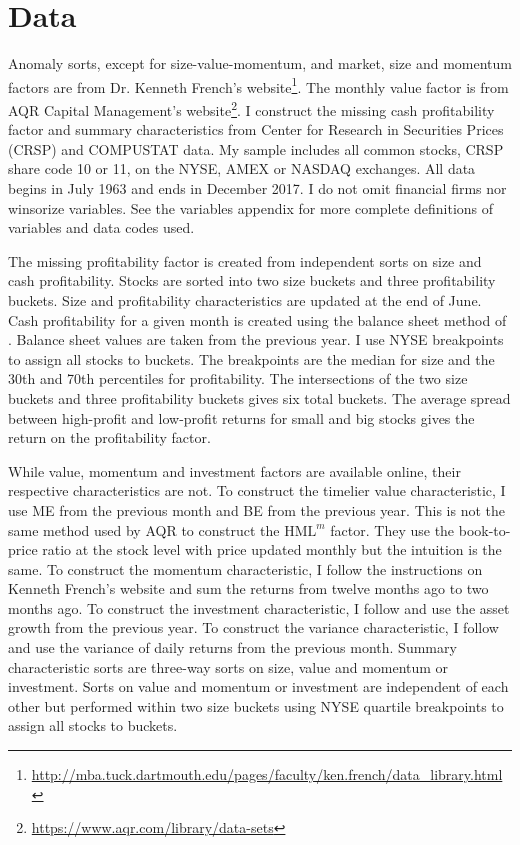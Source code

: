 
\section*{Data}

Anomaly sorts, except for size-value-momentum, and market, size and
momentum factors are from Dr. Kenneth French's website\footnote{
\url{http://mba.tuck.dartmouth.edu/pages/faculty/ken.french/data_library.html}
}. The monthly value factor is from AQR Capital Management's website\footnote{
\url{https://www.aqr.com/library/data-sets}
}.
I construct the missing cash profitability factor and summary characteristics
from Center for Research in Securities Prices (CRSP) and COMPUSTAT data. My
sample includes all common stocks, CRSP share code 10 or 11, on the NYSE, AMEX
or NASDAQ exchanges. All data begins in July 1963 and ends in December 2017. I
do not omit financial firms nor winsorize variables. See the variables appendix
for more complete definitions of variables and data codes used.

The missing profitability factor is created from independent sorts on size and
cash profitability.
Stocks are sorted into two size buckets and three profitability buckets.
Size and profitability characteristics are updated at the end of June.
Cash profitability for a given month is created using the balance sheet method
of \textcite{ball2016accruals}.
Balance sheet values are taken from the previous year. 
I use NYSE breakpoints to assign all stocks to buckets.
The breakpoints are the median for size and the 30th and 70th percentiles for
profitability.
The intersections of the two size buckets and three profitability buckets
gives six total buckets.
The average spread between high-profit and low-profit returns for small
and big stocks gives the return on the profitability factor.

While value, momentum and investment factors are available online, their
respective characteristics are not.
To construct the timelier value characteristic,
I use ME from the previous month and BE from the previous year.
This is not the same method used by AQR to construct the $\text{HML}^m$ factor.
They use the book-to-price ratio at the stock level with price updated monthly
but the intuition is the same.
To construct the momentum characteristic, I follow the instructions on Kenneth
French’s website and sum the returns from twelve months ago to two months ago.
To construct the investment characteristic,
I follow \textcite{fama2015five} and use the asset growth from the previous
year.
To construct the variance characteristic, I follow
\textcite{moreira2017volatility} and use the variance of daily returns from the
previous month.
Summary characteristic sorts are three-way sorts on size, value and momentum or
investment.
Sorts on value and momentum or investment are independent of each other but
performed within two size buckets using NYSE quartile breakpoints to assign all
stocks to buckets.
